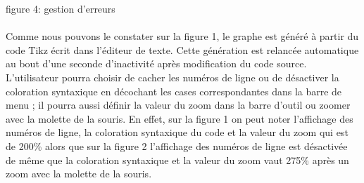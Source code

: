 \documentclass[a4paper]{report}
\begin{document}
figure 4: gestion d'erreurs
\\
\\
	Comme nous pouvons le constater sur la figure 1, le graphe est généré à partir du code Tikz écrit dans l'éditeur de texte. Cette génération est relancée automatique au bout d'une seconde d'inactivité après modification du code source. L'utilisateur pourra choisir de cacher les numéros de ligne ou de désactiver la coloration syntaxique en décochant les cases correspondantes dans la barre de menu ; il pourra aussi définir la valeur du zoom dans la barre d'outil ou zoomer avec la molette de la souris. En effet, sur la figure 1 on peut noter l'affichage des numéros de ligne, la coloration syntaxique du code et la valeur du zoom qui est de 200\%
alors que sur la figure 2 l'affichage des numéros de ligne est désactivée de même que la coloration syntaxique et la valeur du zoom vaut 275\% après un zoom avec la molette de la souris.
\end{document}
